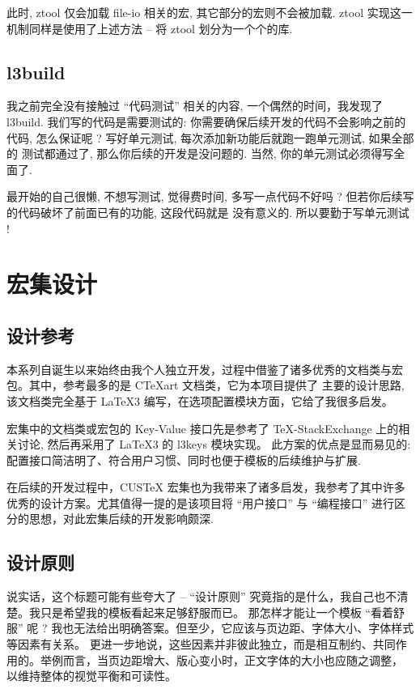\documentclass[
  hyper, lang=cn,
  mathSpec={envStyle=leftbar},
]{../../zlatex/code/ztex}
\newcommand{\pkg}[1]{\textsf{#1}}
\newcommand{\cls}[1]{\textsf{#1}}
\begin{document}
\noindent 此时, \pkg{ztool} 仅会加载 \pkg{file-io} 相关的宏, 其它部分的宏则不会被加载. \pkg{ztool}
实现这一机制同样是使用了上述方法 -- 将 \pkg{ztool} 划分为一个个的库.


\clearpage
\subsection{l3build}
我之前完全没有接触过 ``代码测试'' 相关的内容, 一个偶然的时间，我发现了 \pkg{l3build}. 我们写的代码是需要测试的:
你需要确保后续开发的代码不会影响之前的代码, 怎么保证呢 ? 写好单元测试, 每次添加新功能后就跑一跑单元测试, 如果全部的
测试都通过了, 那么你后续的开发是没问题的. 当然, 你的单元测试必须得写全面了.

最开始的自己很懒, 不想写测试, 觉得费时间, 多写一点代码不好吗 ? 但若你后续写的代码破坏了前面已有的功能, 这段代码就是
没有意义的. 所以要勤于写单元测试 !


\clearpage
\section{宏集设计}
\subsection{设计参考}
本系列自诞生以来始终由我个人独立开发，过程中借鉴了诸多优秀的文档类与宏包。其中，参考最多的是 {C\TeX{}art} 文档类，它为本项目提供了
主要的设计思路, 该文档类完全基于 \LaTeX3 编写，在选项配置模块方面，它给了我很多启发。

\ztex{} 宏集中的文档类或宏包的 Key-Value 接口先是参考了 \TeX-StackExchange 上的相关讨论, 然后再采用了 \LaTeX3 的 \pkg{l3keys} 模块实现。
此方案的优点是显而易见的: 配置接口简洁明了、符合用户习惯、同时也便于模板的后续维护与扩展.

在后续的开发过程中，\cls{CUSTeX} 宏集也为我带来了诸多启发，我参考了其中许多优秀的设计方案。尤其值得一提的是该项目将
``用户接口'' 与 ``编程接口'' 进行区分的思想，对此宏集后续的开发影响颇深.


\clearpage
\subsection{设计原则}
说实话，这个标题可能有些夸大了 -- ``设计原则'' 究竟指的是什么，我自己也不清楚。我只是希望我的模板看起来足够舒服而已。
那怎样才能让一个模板 ``看着舒服'' 呢 ? 我也无法给出明确答案。但至少，它应该与页边距、字体大小、字体样式等因素有关系。
更进一步地说，这些因素并非彼此独立，而是相互制约、共同作用的。举例而言，当页边距增大、版心变小时，正文字体的大小也应随之调整，
以维持整体的视觉平衡和可读性。
\end{document}

